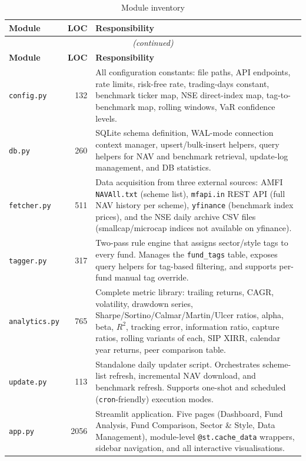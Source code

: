 \documentclass[12pt, a4paper]{article}
\begin{document}
\begin{longtable}{@{}p{}r p{}@{}}
\caption{Module inventory}\label{tab:modules}\\
\toprule
\textbf{Module} & \textbf{LOC} & \textbf{Responsibility} \\
\midrule
\endfirsthead
\multicolumn{3}{c}{\textit{(continued)}}\\
\toprule
\textbf{Module} & \textbf{LOC} & \textbf{Responsibility} \\
\midrule
\endhead
\texttt{config.py} & 132 &
  All configuration constants: file paths, API endpoints, rate limits,
  risk-free rate, trading-days constant, benchmark ticker map,
  NSE direct-index map, tag-to-benchmark map, rolling windows,
  VaR confidence levels. \\[4pt]
\texttt{db.py} & 260 &
  SQLite schema definition, WAL-mode connection context manager,
  upsert/bulk-insert helpers, query helpers for NAV and benchmark
  retrieval, update-log management, and DB statistics. \\[4pt]
\texttt{fetcher.py} & 511 &
  Data acquisition from three external sources: AMFI
  \texttt{NAVAll.txt} (scheme list), \texttt{mfapi.in} REST API
  (full NAV history per scheme), \texttt{yfinance} (benchmark index
  prices), and the NSE daily archive CSV files (smallcap/microcap
  indices not available on yfinance). \\[4pt]
\texttt{tagger.py} & 317 &
  Two-pass rule engine that assigns sector/style tags to every fund.
  Manages the \texttt{fund\_tags} table, exposes query helpers for
  tag-based filtering, and supports per-fund manual tag override. \\[4pt]
\texttt{analytics.py} & 765 &
  Complete metric library: trailing returns, CAGR, volatility,
  drawdown series, Sharpe/Sortino/Calmar/Martin/Ulcer ratios,
  alpha, beta, $R^2$, tracking error, information ratio,
  capture ratios, rolling variants of each, SIP XIRR,
  calendar year returns, peer comparison table. \\[4pt]
\texttt{update.py} & 113 &
  Standalone daily updater script.  Orchestrates scheme-list refresh,
  incremental NAV download, and benchmark refresh.  Supports
  one-shot and scheduled (\texttt{cron}-friendly) execution modes. \\[4pt]
\texttt{app.py} & 2056 &
  Streamlit application.  Five pages (Dashboard, Fund Analysis,
  Fund Comparison, Sector \& Style, Data Management), module-level
  \texttt{@st.cache\_data} wrappers, sidebar navigation, and all
  interactive visualisations. \\
\bottomrule
\end{longtable}
\end{document}
